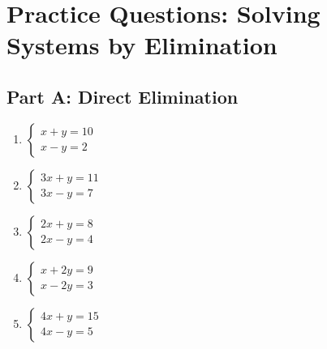 \documentclass[14pt]{extarticle}
\begin{document}
\newpage


\section*{Practice Questions: Solving Systems by Elimination}

\subsection*{Part A: Direct Elimination}
\begin{enumerate}
    \item \(\begin{cases} x + y = 10 \\ x - y = 2 \end{cases}\)
    \item \(\begin{cases} 3x + y = 11 \\ 3x - y = 7 \end{cases}\)
    \item \(\begin{cases} 2x + y = 8 \\ 2x - y = 4 \end{cases}\)
    \item \(\begin{cases} x + 2y = 9 \\ x - 2y = 3 \end{cases}\)
    \item \(\begin{cases} 4x + y = 15 \\ 4x - y = 5 \end{cases}\)
\end{enumerate}
\end{document}
